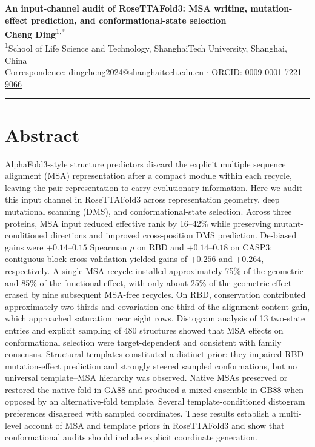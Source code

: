 \documentclass[10pt,a4paper]{article}
\begin{document}
\begin{center}
    {\LARGE\textbf{\color{primary}An input-channel audit of RoseTTAFold3: MSA writing, mutation-effect prediction, and conformational-state selection}}\\[10pt]
    {\normalsize \textbf{Cheng Ding}\textsuperscript{1,*}}\\[6pt]
    {\small \textsuperscript{1}School of Life Science and Technology, ShanghaiTech University, Shanghai, China}\\[4pt]
    {\small * Correspondence: \href{mailto:dingcheng2024@shanghaitech.edu.cn}{dingcheng2024@shanghaitech.edu.cn} $\cdot$ ORCID: \href{https://orcid.org/0009-0001-7221-9066}{0009-0001-7221-9066}}
\end{center}

\vspace{4pt}
\noindent\textcolor{rulecolor}{\rule{\textwidth}{0.8pt}}

\section*{Abstract}
AlphaFold3-style structure predictors discard the explicit multiple sequence alignment (MSA) representation after a compact module within each recycle, leaving the pair representation to carry evolutionary information. Here we audit this input channel in RoseTTAFold3 across representation geometry, deep mutational scanning (DMS), and conformational-state selection. Across three proteins, MSA input reduced effective rank by 16--42\% while preserving mutant-conditioned directions and improved cross-position DMS prediction. De-biased gains were $+0.14$--$0.15$ Spearman $\rho$ on RBD and $+0.14$--$0.18$ on CASP3; contiguous-block cross-validation yielded gains of $+0.256$ and $+0.264$, respectively. A single MSA recycle installed approximately 75\% of the geometric and 85\% of the functional effect, with only about 25\% of the geometric effect erased by nine subsequent MSA-free recycles. On RBD, conservation contributed approximately two-thirds and covariation one-third of the alignment-content gain, which approached saturation near eight rows. Distogram analysis of 13 two-state entries and explicit sampling of 480 structures showed that MSA effects on conformational selection were target-dependent and consistent with family consensus. Structural templates constituted a distinct prior: they impaired RBD mutation-effect prediction and strongly steered sampled conformations, but no universal template--MSA hierarchy was observed. Native MSAs preserved or restored the native fold in GA88 and produced a mixed ensemble in GB88 when opposed by an alternative-fold template. Several template-conditioned distogram preferences disagreed with sampled coordinates. These results establish a multi-level account of MSA and template priors in RoseTTAFold3 and show that conformational audits should include explicit coordinate generation.
\end{document}
